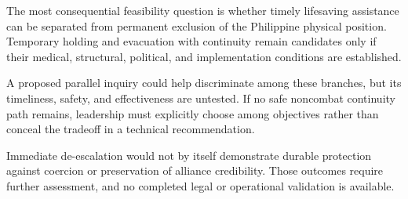 \documentclass[11pt]{article}
\begin{document}
The most consequential feasibility question is whether timely lifesaving assistance can be separated from permanent exclusion of the Philippine physical position. Temporary holding and evacuation with continuity remain candidates only if their medical, structural, political, and implementation conditions are established.

A proposed parallel inquiry could help discriminate among these branches, but its timeliness, safety, and effectiveness are untested. If no safe noncombat continuity path remains, leadership must explicitly choose among objectives rather than conceal the tradeoff in a technical recommendation.

Immediate de-escalation would not by itself demonstrate durable protection against coercion or preservation of alliance credibility. Those outcomes require further assessment, and no completed legal or operational validation is available.

\appendix
\end{document}
